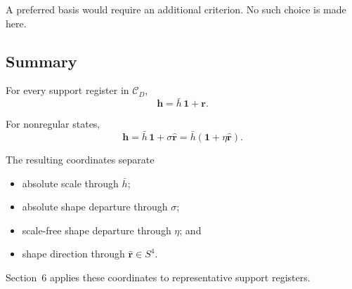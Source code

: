 A preferred basis would require an additional criterion. No such choice is
made here.

\subsection{Summary}

For every support register in \(\mathcal C_D\),
\[
\mathbf h
=
\bar h\,\mathbf 1+\mathbf r.
\]

For nonregular states,
\[
\mathbf h
=
\bar h\,\mathbf 1
+
\sigma\widehat{\mathbf r}
=
\bar h
\left(
\mathbf 1+\eta\widehat{\mathbf r}
\right).
\]

The resulting coordinates separate

\begin{itemize}
\item absolute scale through \(\bar h\);
\item absolute shape departure through \(\sigma\);
\item scale-free shape departure through \(\eta\); and
\item shape direction through \(\widehat{\mathbf r}\in S^4\).
\end{itemize}

Section~6 applies these coordinates to representative support registers.

